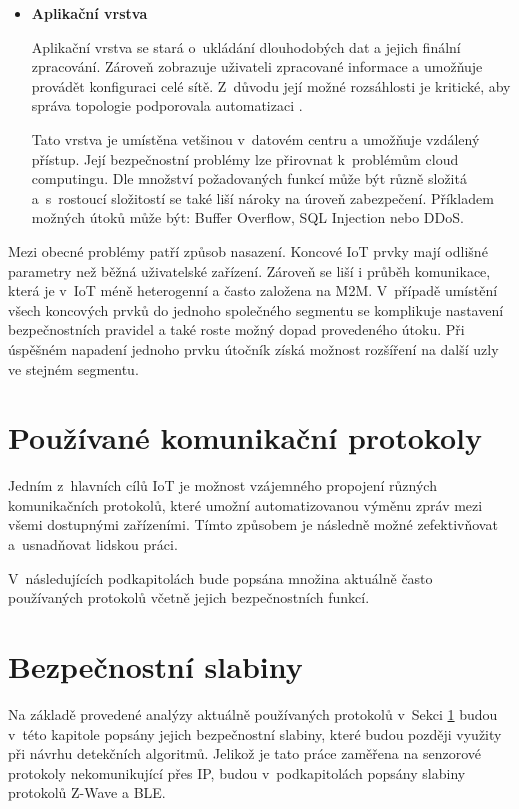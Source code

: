 \begin{itemize}
 \newpage
 \item \textbf{Aplikační vrstva}
 
 Aplikační vrstva se stará o~ukládání dlouhodobých dat a jejich finální zpracování. 
 Zároveň zobrazuje uživateli zpracované informace a umožňuje provádět konfiguraci
 celé sítě. Z~důvodu její možné rozsáhlosti je kritické, aby správa
 topologie podporovala automatizaci \cite{secFramework}.
 
 Tato vrstva je umístěna vetšinou v~datovém centru a umožňuje vzdálený přístup. 
 Její bezpečnostní problémy lze přirovnat k~problémům cloud computingu. Dle
 množství požadovaných funkcí může být různě složitá a~s~rostoucí složitostí
 se také liší nároky na úroveň zabezpečení. Příkladem možných útoků může být:
 Buffer Overflow, SQL Injection nebo DDoS.
 
\end{itemize}

Mezi obecné problémy patří způsob nasazení. Koncové IoT prvky mají odlišné parametry než 
běžná uživatelské zařízení. Zároveň se liší i průběh komunikace, která je v~IoT méně heterogenní
a často založena na M2M. V~případě umístění všech koncových prvků do jednoho společného segmentu
se komplikuje nastavení bezpečnostních pravidel a také roste možný dopad provedeného útoku. 
Při úspěšném napadení jednoho prvku útočník získá možnost rozšíření na další uzly ve stejném
segmentu.

 
 \newpage
 
 \section{Používané komunikační protokoly} \label{protokoly}
 Jedním z~hlavních cílů IoT je možnost vzájemného propojení různých komunikačních protokolů, 
 které umožní automatizovanou výměnu zpráv mezi všemi dostupnými zařízeními. Tímto způsobem
 je následně možné zefektivňovat a~usnadňovat lidskou práci.
 
 V~následujících podkapitolách bude popsána množina aktuálně často používaných protokolů
 včetně jejich bezpečnostních funkcí.
 
  
   
   \newpage
  \section{Bezpečnostní slabiny}
  Na základě provedené analýzy aktuálně používaných protokolů v~Sekci \ref{protokoly} budou v~této kapitole 
  popsány jejich bezpečnostní slabiny, které budou později využity při návrhu 
  detekčních algoritmů. Jelikož je tato práce zaměřena na senzorové protokoly 
  nekomunikující přes IP, budou v~podkapitolách popsány slabiny protokolů 
  Z-Wave a BLE.
  
